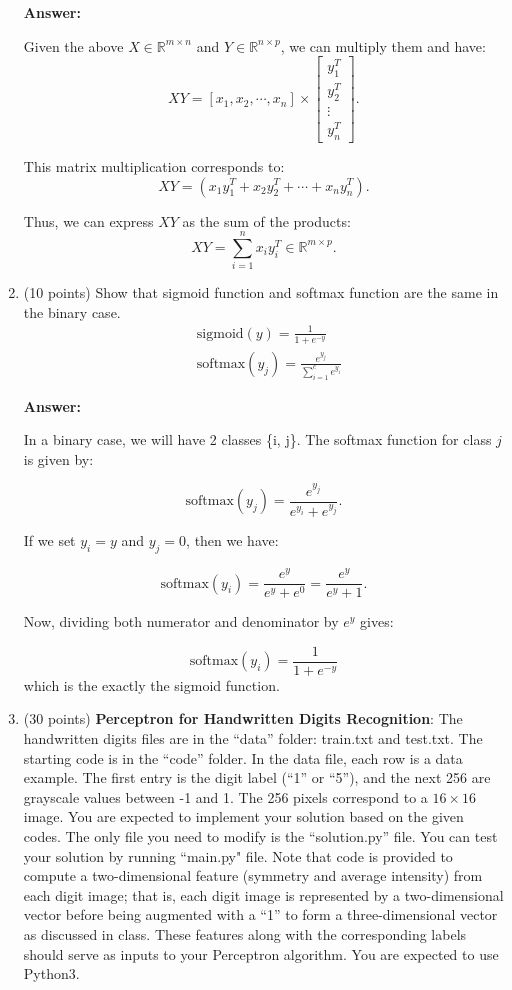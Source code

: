 \documentclass[11pt]{article}
\begin{document}
\begin{enumerate}
    \textbf{Answer:}

Given the above $X \in\mathbb{R}^{m\times n}$ and $Y\in\mathbb{R}^{n\times p}$, we can multiply them and have:
\[XY = [x_1,x_2,\cdots,x_n] \times \begin{bmatrix}
    y_1^T       \\
    y_2^T       \\
    \vdots\\
    y_n^T
\end{bmatrix}.\]

This matrix multiplication corresponds to:
\[XY = (x_1 y_1^T + x_2 y_2^T+\cdots+x_n y_n^T).\]

Thus, we can express $XY$ as the sum of the products:
\[XY=\sum_{i=1}^n x_i y_i^T\in \mathbb{R}^{m\times p}.\]

\item (10 points) Show that sigmoid function and
softmax function are the same in the binary case.
\begin{align*}
    &\mbox{sigmoid}(y) = \frac{1}{1 + e^{-y}}\\
    &\mbox{softmax}(y_j) = \frac{e^{y_j}}{\sum_{i=1}^c e^{y_i}} 
\end{align*}

    \textbf{Answer:}

In a binary case, we will have 2 classes \{i, j\}. The softmax function for class $j$ is given by:

\[\mbox{softmax}(y_j) = \frac{e^{y_j}}{e^{y_i} + e^{y_j}}.\]


If we set $y_i = y$ and $y_j = 0$, then we have:

\[\mbox{softmax}(y_i) = \frac{e^{y}}{e^{y} + e^0} = \frac{e^{y}}{e^{y} + 1}.\]

Now, dividing both numerator and denominator by $e^y$ gives:

\[\mbox{softmax}(y_i) = \frac{1}{1 + e^{-y}}\]
 which is the exactly the sigmoid function.\\

\item (30 points) \textbf{Perceptron for Handwritten Digits Recognition}:
The handwritten digits files are in the ``data'' folder: train.txt
and test.txt. The starting code is in the ``code'' folder. In the
data file, each row is a data example. The first entry is the digit
label (``1'' or ``5''), and the next 256 are grayscale values
between -1 and 1. The 256 pixels correspond to a $16\times16$ image.
You are expected to implement your solution based on the given
codes. The only file you need to modify is the ``solution.py'' file.
You can test your solution by running ``main.py" file. Note that
code is provided to compute a two-dimensional feature (symmetry and
average intensity) from each digit image; that is, each digit image
is represented by a two-dimensional vector before being augmented
with a ``1'' to form a three-dimensional vector as discussed in
class. These features along with the corresponding labels should
serve as inputs to your Perceptron algorithm.
{\color{red}You are expected to use Python3.}


\end{enumerate}
\end{document}
